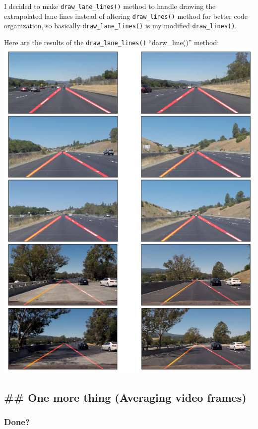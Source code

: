 \documentclass[11pt]{article}
\makeatletter
\def\maxwidth{\ifdim\Gin@nat@width>\linewidth\linewidth
    \else\Gin@nat@width\fi}
\let\Oldincludegraphics\includegraphics
\renewcommand{\includegraphics}[1]{\Oldincludegraphics[width=.8\maxwidth]{#1}}
\makeatother
\begin{document}
I decided to make \texttt{draw\_lane\_lines()} method to handle drawing
the extrapolated lane lines instead of altering \texttt{draw\_lines()}
method for better code organization, so basically
\texttt{draw\_lane\_lines()} is my modified \texttt{draw\_lines()}.

Here are the results of the \texttt{draw\_lane\_lines()}
``darw\_line()'' method:
\includegraphics{test_images_output/extrapolated_test_images.png}

\hypertarget{one-more-thing-averaging-video-frames}{%
\subsection{\#\# One more thing (Averaging video
frames)}\label{one-more-thing-averaging-video-frames}}

\hypertarget{done}{%
\subsubsection{Done?}\label{done}}
\end{document}
